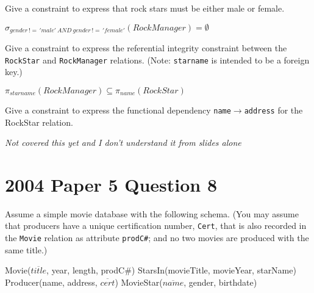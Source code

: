 \documentclass{supervision}
\begin{document}
\begin{questions}
\begin{parts}
          \begin{subparts}
            \subpart[1] Give a constraint to express that rock stars must be
              either male or female.
              \begin{solution}
                $\sigma _{gender \, != \, 'male'\: AND\: gender\, !=\,
                'female'}(RockManager) = \emptyset$
              \end{solution}

            \subpart[3] Give a constraint to express the referential integrity
              constraint between the \lstinline|RockStar| and
              \lstinline|RockManager| relations. (Note: \lstinline|starname|
              is intended to be a foreign key.)
              \begin{solution}
                $\pi _{starname}(RockManager) \subseteq \pi _{name}(RockStar)$
              \end{solution}

            \subpart[4] Give a constraint to express the functional dependency
              \lstinline|name|$\rightarrow$\lstinline|address| for the RockStar
              relation.
              \begin{solution}
                \emph{Not covered this yet and I don't understand it from slides alone}
              \end{solution}

          \end{subparts}
      \end{parts}
    \question
      \section*{2004 Paper 5 Question 8}
      Assume a simple movie database with the following schema. (You may assume
      that producers have a unique certification number, \lstinline|Cert|, that
      is also recorded in the \lstinline|Movie| relation as attribute
      \lstinline|prodC#|; and no two movies are produced with the same title.)

      \begin{code}[mathescape]{}
        Movie($\overline{title}$, year, length, prodC#)
        StarsIn(movieTitle, movieYear, starName)
        Producer(name, address, $\overline{cert}$)
        MovieStar($\overline{name}$, gender, birthdate)
      \end{code}

      \begin{parts}

\end{parts}
\end{questions}
\end{document}
